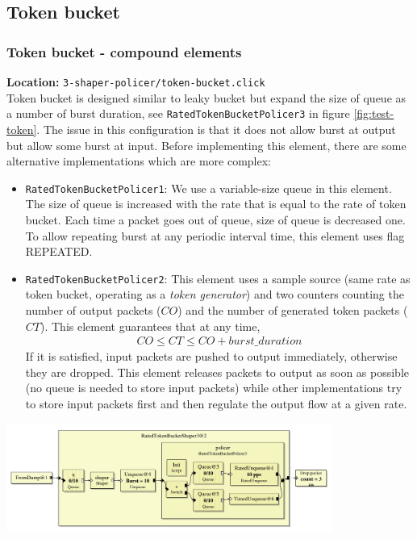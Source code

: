 \documentclass[a4paper]{article}
\begin{document}
  \subsection{Token bucket}
  \subsubsection{Token bucket - compound elements}
  \textbf{Location:} \texttt{3-shaper-policer/token-bucket.click} \\
  Token bucket is designed similar to leaky bucket but expand the size of queue as a number of burst duration, see \texttt{RatedTokenBucketPolicer3} in figure \ref{fig:test-token}. The issue in this configuration is that it does not allow burst at output but allow some burst at input. Before implementing this element, there are some alternative implementations which are more complex:
  \begin{itemize}
  	\item \texttt{RatedTokenBucketPolicer1}: We use a variable-size queue in this element. The size of queue is increased with the rate that is equal to the rate of token bucket. Each time a packet goes out of queue, size of queue is decreased one. To allow repeating burst at any periodic interval time, this element uses flag REPEATED.
  	\item \texttt{RatedTokenBucketPolicer2}: This element uses a sample source (same rate as token bucket, operating as a \textit{token generator}) and two counters counting the number of output packets ($CO$) and the number of generated token packets ($CT$). This element guarantees that at any time, \\ 
  	\begin{align*}CO \le CT \le CO + burst\_duration \end{align*}
  	If it is satisfied, input packets are pushed to output immediately, otherwise they are dropped. This element releases packets to output as soon as possible (no queue is needed to store input packets) while other implementations try to store input packets first and then regulate the output flow at a given rate.
  \end{itemize} 
  \begin{center}
	\includegraphics[width=0.8\textwidth]{token-shaper.pdf}
	\label{fig:test-token}
  \end{center}
  
\end{document}

